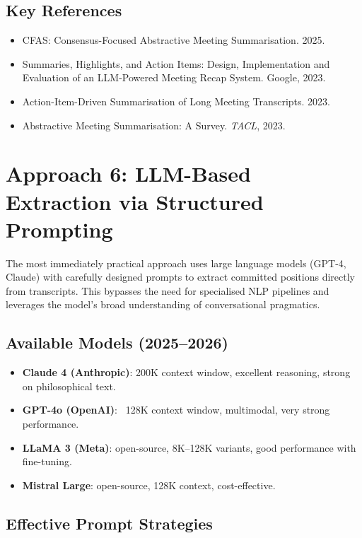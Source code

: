 \documentclass[11pt,letterpaper]{article}
\begin{document}
\subsection{Key References}

\begin{itemize}
  \item CFAS: Consensus-Focused Abstractive Meeting Summarisation. 2025.
  \item Summaries, Highlights, and Action Items: Design, Implementation and Evaluation of an LLM-Powered Meeting Recap System. Google, 2023.
  \item Action-Item-Driven Summarisation of Long Meeting Transcripts. 2023.
  \item Abstractive Meeting Summarisation: A Survey. \textit{TACL}, 2023.
\end{itemize}

\section{Approach 6: LLM-Based Extraction via Structured Prompting}

The most immediately practical approach uses large language models (GPT-4, Claude) with carefully designed prompts to extract committed positions directly from transcripts. This bypasses the need for specialised NLP pipelines and leverages the model's broad understanding of conversational pragmatics.

\subsection{Available Models (2025–2026)}

\begin{itemize}
  \item \textbf{Claude 4 (Anthropic)}: 200K context window, excellent reasoning, strong on philosophical text.
  \item \textbf{GPT-4o (OpenAI)}: ~128K context window, multimodal, very strong performance.
  \item \textbf{LLaMA 3 (Meta)}: open-source, 8K–128K variants, good performance with fine-tuning.
  \item \textbf{Mistral Large}: open-source, 128K context, cost-effective.
\end{itemize}

\subsection{Effective Prompt Strategies}
\end{document}
